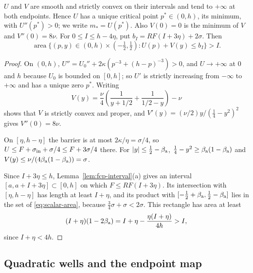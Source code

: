 \begin{lemma}\label{lem:scalar-area}
$U$ and $V$ are smooth and strictly convex on their intervals and tend to $+\infty$ at both endpoints. Hence $U$ has
a unique critical point $p^*\in(0,h)$, its minimum, with $U''(p^*)>0$; we write $m_*=U(p^*)$. Also $V(0)=0$ is the
minimum of $V$ and $V''(0)=8\nu$. For $0\le I\le h-4\eta$, put $b_I=RF(I+3\eta)+2\sigma$. Then
\begin{equation}\label{eq:scalar-area}
 \operatorname{area}\{(p,y)\in(0,h)\times(-\tfrac12,\tfrac12):U(p)+V(y)\le b_I\}>I.
\end{equation}
{\normalfont {}}
\end{lemma}

\begin{proof}
On $(0,h)$, $U''=U_0''+2\kappa(p^{-3}+(h-p)^{-3})>0$, and $U\to+\infty$ at $0$ and $h$ because $U_0$ is bounded on
$[0,h]$; so $U'$ is strictly increasing from $-\infty$ to $+\infty$ and has a unique zero $p^*$. Writing
\[
 V(y)=\frac\nu4\left(\frac1{y+1/2}+\frac1{1/2-y}\right)-\nu
\]
shows that $V$ is strictly convex and proper, and $V'(y)=(\nu/2)y/(\frac14-y^2)^2$ gives $V''(0)=8\nu$.

On $[\eta,h-\eta]$ the barrier is at most $2\kappa/\eta=\sigma/4$, so $U\le F+\sigma_{\rm in}+\sigma/4\le F+3\sigma/4$
there. For $|y|\le\frac12-\beta_{\rm a}$, $\frac14-y^2\ge\beta_{\rm a}(1-\beta_{\rm a})$ and $V(y)\le
\nu/(4\beta_{\rm a}(1-\beta_{\rm a}))=\sigma$.

Since $I+3\eta\le h$, Lemma~\ref{lem:fcp-interval}(a) gives an interval $[a,a+I+3\eta]\subset[0,h]$ on which
$F\le RF(I+3\eta)$. Its intersection with $[\eta,h-\eta]$ has length at least $I+\eta$, and its product with
$[-\frac12+\beta_{\rm a},\frac12-\beta_{\rm a}]$ lies in the set of \eqref{eq:scalar-area}, because
$\frac34\sigma+\sigma<2\sigma$. This rectangle has area at least
\[
 (I+\eta)(1-2\beta_{\rm a})=I+\eta-\frac{\eta(I+\eta)}{4h}>I,
\]
since $I+\eta<4h$.
\end{proof}

\subsection{Quadratic wells and the endpoint map}\label{sec:scalar-wells}

